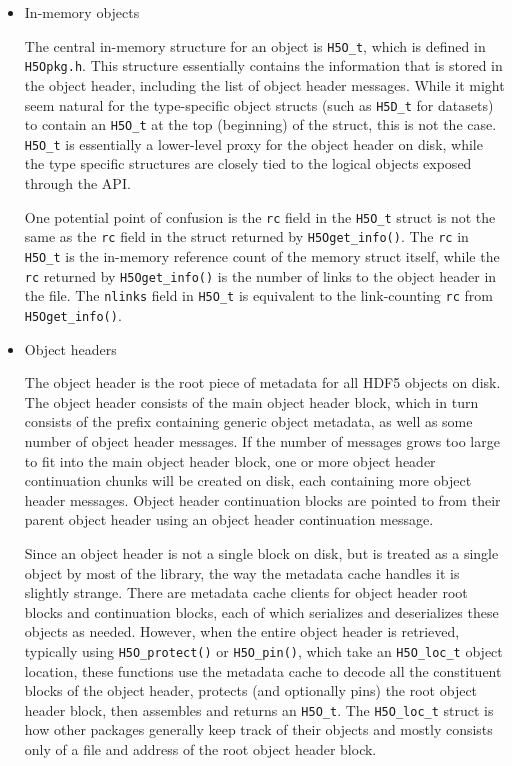 \begin{itemize}
    \item In-memory objects

The central in-memory structure for an object is \texttt{H5O\_t}, which is defined in \texttt{H5Opkg.h}. This structure essentially contains the information that is stored in the object header, including the list of object header messages. While it might seem natural for the type-specific object structs (such as \texttt{H5D\_t} for datasets) to contain an \texttt{H5O\_t} at the top (beginning) of the struct, this is not the case. \texttt{H5O\_t} is essentially a lower-level proxy for the object header on disk, while the type specific structures are closely tied to the logical objects exposed through the API.

One potential point of confusion is the \texttt{rc} field in the \texttt{H5O\_t} struct is not the same as the \texttt{rc} field in the struct returned by \texttt{H5Oget\_info()}. The \texttt{rc} in \texttt{H5O\_t} is the in-memory reference count of the memory struct itself, while the \texttt{rc} returned by \texttt{H5Oget\_info()} is the number of links to the object header in the file. The \texttt{nlinks} field in \texttt{H5O\_t} is equivalent to the link-counting \texttt{rc} from \texttt{H5Oget\_info()}.

    \item Object headers

The object header is the root piece of metadata for all HDF5 objects on disk. The object header consists of the main object header block, which in turn consists of the prefix containing generic object metadata, as well as some number of object header messages. If the number of messages grows too large to fit into the main object header block, one or more object header continuation chunks will be created on disk, each containing more object header messages. Object header continuation blocks are pointed to from their parent object header using an object header continuation message.

Since an object header is not a single block on disk, but is treated as a single object by most of the library, the way the metadata cache handles it is slightly strange. There are metadata cache clients for object header root blocks and continuation blocks, each of which serializes and deserializes these objects as needed. However, when the entire object header is retrieved, typically using \texttt{H5O\_protect()} or \texttt{H5O\_pin()}, which take an \texttt{H5O\_loc\_t} object location, these functions use the metadata cache to decode all the constituent blocks of the object header, protects (and optionally pins) the root object header block, then assembles and returns an \texttt{H5O\_t}. The \texttt{H5O\_loc\_t} struct is how other packages generally keep track of their objects and mostly consists only of a file and address of the root object header block.


\end{itemize}
